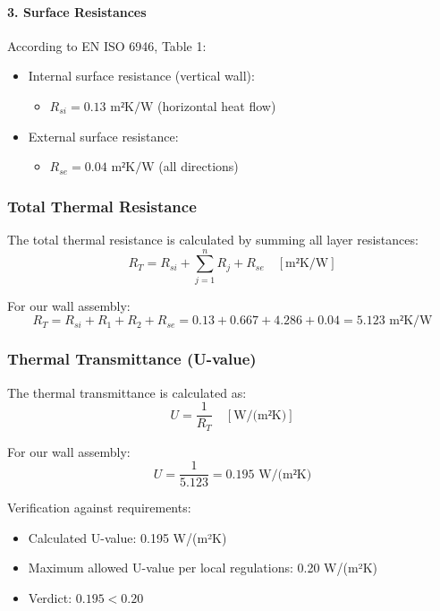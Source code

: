 \documentclass[12pt,a4paper]{article}
\begin{document}
\paragraph{3. Surface Resistances}
According to EN ISO 6946, Table 1:
\begin{itemize}
    \item Internal surface resistance (vertical wall):
        \begin{itemize}
            \item $R_{si} = 0.13 \text{ m²K/W}$ (horizontal heat flow)
        \end{itemize}
    \item External surface resistance:
        \begin{itemize}
            \item $R_{se} = 0.04 \text{ m²K/W}$ (all directions)
        \end{itemize}
\end{itemize}

\subsubsection{Total Thermal Resistance}
The total thermal resistance is calculated by summing all layer resistances:
\begin{equation}
R_T = R_{si} + \sum_{j=1}^{n} R_j + R_{se} \quad [\text{m²K/W}]
\end{equation}

For our wall assembly:
\begin{equation}
R_T = R_{si} + R_1 + R_2 + R_{se} = 0.13 + 0.667 + 4.286 + 0.04 = 5.123 \text{ m²K/W}
\end{equation}

\subsubsection{Thermal Transmittance (U-value)}
The thermal transmittance is calculated as:
\begin{equation}
U = \frac{1}{R_T} \quad [\text{W/(m²K)}]
\end{equation}

For our wall assembly:
\begin{equation}
U = \frac{1}{5.123} = 0.195 \text{ W/(m²K)}
\end{equation}

\noindent
Verification against requirements:
\begin{itemize}
    \item Calculated U-value: 0.195 W/(m²K)
    \item Maximum allowed U-value per local regulations: 0.20 W/(m²K)
    \item Verdict: $0.195 < 0.20$ \quad \checkmark
\end{itemize}
\end{document}

